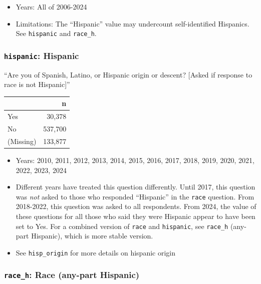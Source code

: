 \documentclass[10pt,article,oneside]{memoir}
\begin{document}
\begin{itemize}
\tightlist
\item
  Years: All of 2006-2024
\item
  Limitations: The ``Hispanic'' value may undercount self-identified
  Hispanics. See \texttt{hispanic} and \texttt{race\_h}.
\end{itemize}

\subsubsection{\texorpdfstring{\texttt{hispanic}:
Hispanic}{hispanic: Hispanic}}\label{hispanic-hispanic}

``Are you of Spanish, Latino, or Hispanic origin or descent? {[}Asked if
response to race is not Hispanic{]}''

\begin{table}[H]
\centering
\begin{tabular}[t]{lr}
\toprule
 & n\\
\midrule
Yes & 30,378\\
No & 537,700\\
(Missing) & 133,877\\
\bottomrule
\end{tabular}
\end{table}

\begin{itemize}
\tightlist
\item
  Years: 2010, 2011, 2012, 2013, 2014, 2015, 2016, 2017, 2018, 2019,
  2020, 2021, 2022, 2023, 2024
\item
  Different years have treated this question differently. Until 2017,
  this question was \emph{not} asked to those who responded ``Hispanic''
  in the \texttt{race} question. From 2018-2022, this question was asked
  to all respondents. From 2024, the value of these questions for all
  those who said they were Hispanic appear to have been set to Yes. For
  a combined version of \texttt{race} and \texttt{hispanic}, see
  \texttt{race\_h} (any-part Hispanic), which is more stable version.
\item
  See \texttt{hisp\_origin} for more details on hispanic origin
\end{itemize}

\subsubsection{\texorpdfstring{\texttt{race\_h}: Race (any-part
Hispanic)}{race\_h: Race (any-part Hispanic)}}\label{race_h-race-any-part-hispanic}
\end{document}
